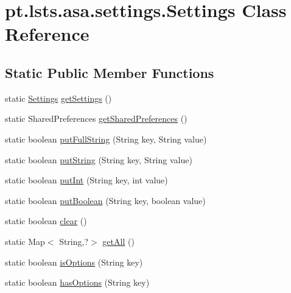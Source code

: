 \hypertarget{classpt_1_1lsts_1_1asa_1_1settings_1_1Settings}{}\section{pt.\+lsts.\+asa.\+settings.\+Settings Class Reference}
\label{classpt_1_1lsts_1_1asa_1_1settings_1_1Settings}
\subsection*{Static Public Member Functions}
\begin{DoxyCompactItemize}
\item 
static \hyperlink{classpt_1_1lsts_1_1asa_1_1settings_1_1Settings}{Settings} \hyperlink{classpt_1_1lsts_1_1asa_1_1settings_1_1Settings_a8a6bce4f0d98ff1e0839841893de62be}{get\+Settings} ()
\item 
static Shared\+Preferences \hyperlink{classpt_1_1lsts_1_1asa_1_1settings_1_1Settings_ac3ae82318b29a27033d1b1f2897f692b}{get\+Shared\+Preferences} ()
\item 
static boolean \hyperlink{classpt_1_1lsts_1_1asa_1_1settings_1_1Settings_a7a44778db45e954269a8622dde633ab5}{put\+Full\+String} (String key, String value)
\item 
static boolean \hyperlink{classpt_1_1lsts_1_1asa_1_1settings_1_1Settings_a60dad12334ae68b8f9c985188fd2107a}{put\+String} (String key, String value)
\item 
static boolean \hyperlink{classpt_1_1lsts_1_1asa_1_1settings_1_1Settings_a567a25e80e3180556b4868d7bc0e90b8}{put\+Int} (String key, int value)
\item 
static boolean \hyperlink{classpt_1_1lsts_1_1asa_1_1settings_1_1Settings_a65065c35affa4c8ade2d7aa9fc4c75e8}{put\+Boolean} (String key, boolean value)
\item 
static boolean \hyperlink{classpt_1_1lsts_1_1asa_1_1settings_1_1Settings_a1fe71f4bc3ce78d542ceb322589d2592}{clear} ()
\item 
static Map$<$ String,?$>$ \hyperlink{classpt_1_1lsts_1_1asa_1_1settings_1_1Settings_a2d9948395451794fe20a0bc2748452a2}{get\+All} ()
\item 
static boolean \hyperlink{classpt_1_1lsts_1_1asa_1_1settings_1_1Settings_a2f755f744e0cc3018cb94ba243fe1f32}{is\+Options} (String key)
\item 
static boolean \hyperlink{classpt_1_1lsts_1_1asa_1_1settings_1_1Settings_a9cb3521cebd1ccb3b022c8f65a537038}{has\+Options} (String key)

\end{DoxyCompactItemize}
